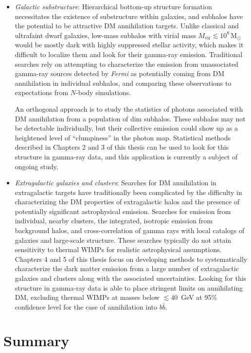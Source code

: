 \begin{itemize}
\item \emph{Galactic substructure}: Hierarchical bottom-up structure formation necessitates the existence of substructure within galaxies, and subhalos have the potential to be attractive DM annihilation targets. Unlike classical and ultrafaint dwarf galaxies, low-mass subhalos with virial mass $M_\mathrm{vir}\lesssim 10^8$\,M$_\odot$ would be mostly dark with highly suppressed stellar activity, which makes it difficult to localize them and look for their gamma-ray emission. Traditional searches rely on attempting to characterize the emission from unassociated gamma-ray sources detected by \emph{Fermi} as potentially coming from DM annihilation in individual subhalos, and comparing these observations to expectations from $N$-body simulations.

An orthogonal approach is to study the statistics of photons associated with DM annihilation from a population of dim subhalos. These subhalos may not be detectable individually, but their collective emission could show up as a heightened level of ``clumpiness'' in the photon map. Statistical methods described in Chapters 2 and 3 of this thesis can be used to look for this structure in gamma-ray data, and this application is currently a subject of ongoing study.

\item \emph{Extragalactic galaxies and clusters}: Searches for DM annihilation in extragalactic targets have traditionally been complicated by the difficulty in characterizing the DM properties of extragalactic halos and the presence of potentially significant astrophysical emission. Searches for emission from individual, nearby clusters, the integrated, isotropic emission from background halos, and cross-correlation of gamma rays with local catalogs of galaxies and large-scale structure. These searches typically do not attain sensitivity to thermal WIMPs for realistic astrophysical assumptions. Chapters 4 and 5 of this thesis focus on developing methods to systematically characterize the dark matter emission from a large number of extragalactic galaxies and clusters along with the associated uncertainties. Looking for this structure in gamma-ray data is able to place stringent limits on annihilating DM, excluding thermal WIMPs at masses below $\lesssim 40$~GeV at 95\% confidence level for the case of annihilation into $b\bar b$. 
\end{itemize}

\section{Summary}
\label{sec:summary}



